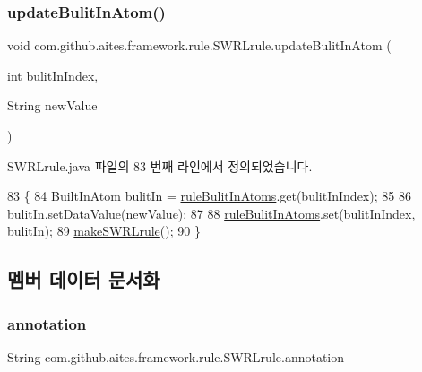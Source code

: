 \subsubsection{\texorpdfstring{update\+Bulit\+In\+Atom()}{updateBulitInAtom()}}
{\footnotesize\ttfamily void com.\+github.\+aites.\+framework.\+rule.\+S\+W\+R\+Lrule.\+update\+Bulit\+In\+Atom (\begin{DoxyParamCaption}\item[{int}]{bulit\+In\+Index,  }\item[{String}]{new\+Value }\end{DoxyParamCaption})}



S\+W\+R\+Lrule.\+java 파일의 83 번째 라인에서 정의되었습니다.


\begin{DoxyCode}
83                                                                     \{
84         BuiltInAtom bulitIn = \mbox{\hyperlink{classcom_1_1github_1_1aites_1_1framework_1_1rule_1_1_s_w_r_lrule_a1ccff2ed582cdf233f27d0127fa2f1c0}{ruleBulitInAtoms}}.get(bulitInIndex);
85         
86         bulitIn.setDataValue(newValue);
87         
88         \mbox{\hyperlink{classcom_1_1github_1_1aites_1_1framework_1_1rule_1_1_s_w_r_lrule_a1ccff2ed582cdf233f27d0127fa2f1c0}{ruleBulitInAtoms}}.set(bulitInIndex, bulitIn);
89         \mbox{\hyperlink{classcom_1_1github_1_1aites_1_1framework_1_1rule_1_1_s_w_r_lrule_a8b6f04d7d532e8150e4be3ba796c28e9}{makeSWRLrule}}();
90     \}
\end{DoxyCode}


\subsection{멤버 데이터 문서화}
\mbox{\label{classcom_1_1github_1_1aites_1_1framework_1_1rule_1_1_s_w_r_lrule_af98a0b14045d483b30ad511f0627fe3f}} 
\subsubsection{\texorpdfstring{annotation}{annotation}}
{\footnotesize\ttfamily String com.\+github.\+aites.\+framework.\+rule.\+S\+W\+R\+Lrule.\+annotation\hspace{0.3cm}{\ttfamily [private]}}



